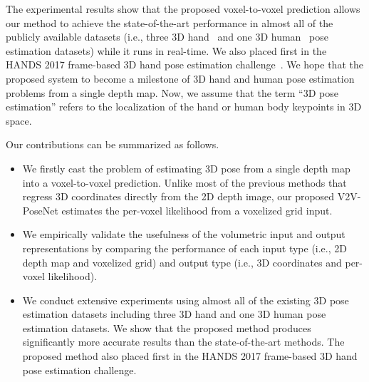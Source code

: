 The experimental results show that the proposed voxel-to-voxel prediction allows our method to achieve the state-of-the-art performance in almost all of the publicly available datasets (i.e., three 3D hand~\cite{tompson2014real,tang2014latent,sun2015cascaded} and one 3D human~\cite{haque2016towards} pose estimation datasets) while it runs in real-time. We also placed first in the HANDS 2017 frame-based 3D hand pose estimation challenge~\cite{yuan20172017}. We hope that the proposed system to become a milestone of 3D hand and human pose estimation problems from a single depth map. Now, we assume that the term \enquote{3D pose estimation} refers to the localization of the hand or human body keypoints in 3D space.

Our contributions can be summarized as follows. 
\begin{itemize}
\item We firstly cast the problem of estimating 3D pose from a single depth map into a voxel-to-voxel prediction. Unlike most of the previous methods that regress 3D coordinates directly from the 2D depth image, our proposed V2V-PoseNet estimates the per-voxel likelihood from a voxelized grid input. 

\item We empirically validate the usefulness of the volumetric input and output representations by comparing the performance of each input type (i.e., 2D depth map and voxelized grid) and output type (i.e., 3D coordinates and per-voxel likelihood).

\item We conduct extensive experiments using almost all of the existing 3D pose estimation datasets including three 3D hand and one 3D human pose estimation datasets. We show that the proposed method produces significantly more accurate results than the state-of-the-art methods. The proposed method also placed first in the HANDS 2017 frame-based 3D hand pose estimation challenge.
\end{itemize}

